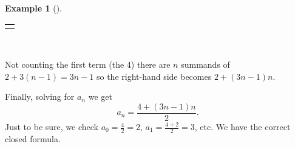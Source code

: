 \documentclass[12pt,]{book}
\theoremstyle{plain}
\theoremstyle{definition}
\theoremstyle{definition}
\newtheorem{example}[theorem]{Example}
\theoremstyle{definition}
\numberwithin{equation}{chapter}
\newlength{\panelmax}
\renewcommand{\d}{\displaystyle}
\begin{document}
\begin{example}[]
{%
\setlength{\tabcolsep}{0\linewidth}
\par\medskip\noindent
\begin{tabular}{@{}*{1}{c}@{}}
\begin{minipage}[c][\panelmax][t]{1\linewidth}\usebox{\panelboxAtabular}\end{minipage}\end{tabular}\\
}%
\par
\hypertarget{p-150}{}%
Not counting the first term (the 4) there are \(n\) summands of \(2+3(n-1) = 3n-1\) so the right-hand side becomes \(2+(3n-1)n\).%
\par
\hypertarget{p-151}{}%
Finally, solving for \(a_n\) we get%
\begin{equation*}
a_n = \d \frac{4+(3n-1)n}{2}.
\end{equation*}
Just to be sure, we check \(a_0 = \frac{4}{2} = 2\), \(a_1 = \frac{4+2}{2} = 3\), etc.  We have the correct closed formula.%
\end{example}
\typeout{************************************************}
\typeout{************************************************}
\end{document}
